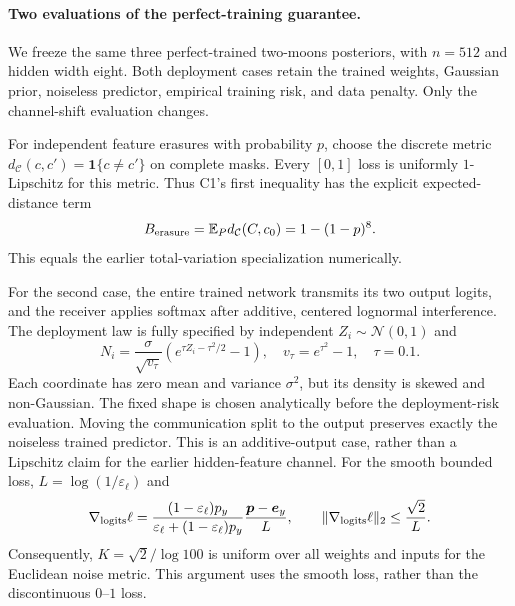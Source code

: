 \paragraph{Two evaluations of the perfect-training guarantee.}
We freeze the same three perfect-trained two-moons posteriors, with $n=512$
and hidden width eight. Both deployment cases retain the trained weights,
Gaussian prior, noiseless predictor, empirical training risk, and data
penalty. Only the channel-shift evaluation changes.

For independent feature erasures with probability $p$, choose the discrete
metric $d_{\mathcal C}(c,c')=\mathbf1\{c\ne c'\}$ on complete masks.
Every $[0,1]$ loss is uniformly $1$-Lipschitz for this metric. Thus C1's
first inequality has the explicit expected-distance term
\begin{equation}
 B_{\rm erasure}=\mathbb E_Pd_{\mathcal C}(C,c_0)=1-(1-p)^8.
 \label{equ:sim_c1_erasure}
\end{equation}
This equals the earlier total-variation specialization numerically.

For the second case, the entire trained network transmits its two output
logits, and the receiver applies softmax after additive, centered lognormal
interference. The deployment law is fully specified by independent
$Z_i\sim\mathcal N(0,1)$ and
\begin{equation}
 N_i=\frac{\sigma}{\sqrt{v_\tau}}
       (e^{\tau Z_i-\tau^2/2}-1),\quad
 v_\tau=e^{\tau^2}-1,\quad \tau=0.1.
 \label{equ:sim_c1_lognormal_channel}
\end{equation}
Each coordinate has zero mean and variance $\sigma^2$, but its density is
skewed and non-Gaussian. The fixed shape is chosen analytically before the
deployment-risk evaluation. Moving the communication split to the output
preserves exactly the noiseless trained predictor. This is an additive-output
case, rather than a Lipschitz claim for the earlier hidden-feature channel.
For the smooth bounded loss, $L=\log(1/\varepsilon_\ell)$ and
\begin{equation}
 \nabla_{\rm logits}\ell=
 \frac{(1-\varepsilon_\ell)p_y}
 {\varepsilon_\ell+(1-\varepsilon_\ell)p_y}
 \frac{\boldsymbol p-\boldsymbol e_y}{L},\qquad
 \|\nabla_{\rm logits}\ell\|_2\leq\frac{\sqrt2}{L}.
 \label{equ:sim_c1_logit_lipschitz}
\end{equation}
Consequently, $K=\sqrt2/\log100$ is uniform over all weights and inputs for
the Euclidean noise metric. This argument uses the smooth loss, rather
than the discontinuous $0$--$1$ loss.

